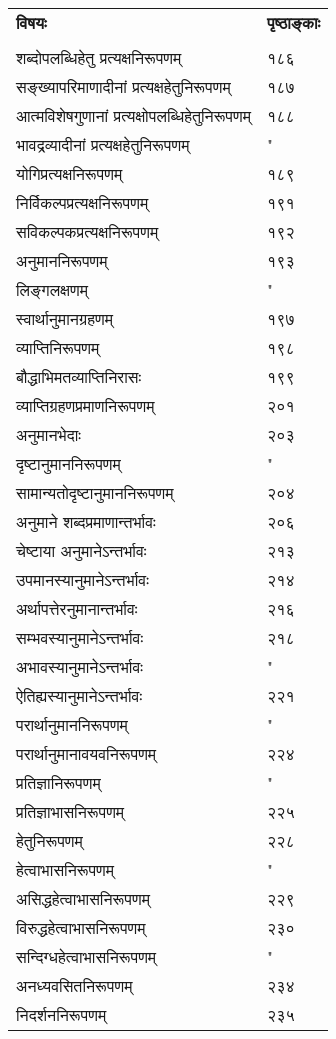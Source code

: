 \documentclass[11pt, openany]{book}
\begin{document}
\newpage
\noindent
\begin{tabular}{m{28em} m{2em}}
\textbf{विषयः} & \textbf{पृष्ठाङ्काः}\\
 &\\ 
 शब्दोपलब्धिहेतु प्रत्यक्षनिरूपणम् & १८६\\
सङ्ख्यापरिमाणादीनां प्रत्यक्षहेतुनिरूपणम् & १८७\\
आत्मविशेषगुणानां प्रत्यक्षोपलब्धिहेतुनिरूपणम् & १८८\\
भावद्रव्यादीनां प्रत्यक्षहेतुनिरूपणम् & "\\
योगिप्रत्यक्षनिरूपणम् & १८९\\
निर्विकल्पप्रत्यक्षनिरूपणम् & १९१\\
सविकल्पकप्रत्यक्षनिरूपणम् & १९२\\
अनुमाननिरूपणम् & १९३\\
लिङ्गलक्षणम् & "\\
स्वार्थानुमानग्रहणम् & १९७\\
व्याप्तिनिरूपणम् & १९८\\
बौद्धाभिमतव्याप्तिनिरासः & १९९\\
व्याप्तिग्रहणप्रमाणनिरूपणम् & २०१\\
अनुमानभेदाः & २०३\\
दृष्टानुमाननिरूपणम् & "\\
सामान्यतोदृष्टानुमाननिरूपणम् & २०४\\
अनुमाने शब्दप्रमाणान्तर्भावः & २०६\\
चेष्टाया अनुमानेऽन्तर्भावः & २१३\\
उपमानस्यानुमानेऽन्तर्भावः & २१४\\
अर्थापत्तेरनुमानान्तर्भावः & २१६\\
सम्भवस्यानुमानेऽन्तर्भावः & २१८\\
अभावस्यानुमानेऽन्तर्भावः & "\\
ऐतिह्यस्यानुमानेऽन्तर्भावः & २२१\\
परार्थानुमाननिरूपणम् & "\\
परार्थानुमानावयवनिरूपणम् & २२४\\
प्रतिज्ञानिरूपणम् & "\\
प्रतिज्ञाभासनिरूपणम् & २२५\\
हेतुनिरूपणम् & २२८\\
हेत्वाभासनिरूपणम् & "\\
असिद्धहेत्वाभासनिरूपणम् & २२९\\
विरुद्धहेत्वाभासनिरूपणम् & २३०\\
सन्दिग्धहेत्वाभासनिरूपणम् & "\\
अनध्यवसितनिरूपणम् & २३४\\
निदर्शननिरूपणम् & २३५
\end{tabular}
\end{document}
